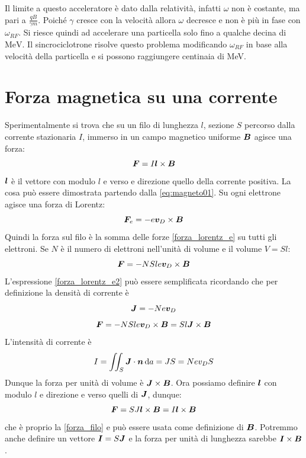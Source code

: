 \begin{Es}[Ciclotrone]
  Il limite a questo acceleratore è dato dalla relatività, infatti $\omega$ non è costante, ma pari a $\frac{qB}{\gamma m}$. Poiché $\gamma$ cresce con la velocità allora $\omega$ decresce e non è più in fase con $\omega_{RF}$. Si riesce quindi ad accelerare una particella solo fino a qualche decina di $\si{\MeV}$. Il sincrociclotrone risolve questo problema modificando $\omega_{RF}$ in base alla velocità della particella e si possono raggiungere centinaia di \si{\MeV}.
\end{Es}


\section{Forza magnetica su una corrente}
Sperimentalmente si trova che su un filo di lunghezza $l$, sezione $S$ percorso dalla corrente stazionaria $I$, immerso in un campo magnetico uniforme $\boldsymbol{B}$ agisce una forza:
\begin{equation}
  \boldsymbol{F}=I\boldsymbol{l}\times \boldsymbol{B}
  \label{forza_filo}
\end{equation}
$\boldsymbol{l}$ è il vettore con modulo $l$ e verso e direzione quello della corrente positiva. La cosa può essere dimostrata partendo dalla \eqref{eq:magneto01}. Su ogni elettrone agisce una forza di Lorentz:
\begin{equation}
  \boldsymbol{F}_e=-e\boldsymbol{v}_D\times\boldsymbol{B}
  \label{forza_lorentz_e}
\end{equation}
Quindi la forza sul filo è la somma delle forze \eqref{forza_lorentz_e} su tutti gli elettroni. Se $N$ è il numero di elettroni nell'unità di volume e il volume $V=Sl$:
\begin{equation}
  \boldsymbol{F}=-NSle\boldsymbol{v}_D\times\boldsymbol{B}
  \label{forza_lorentz_e2}
\end{equation}
L'espressione \eqref{forza_lorentz_e2} può essere semplificata ricordando che per definizione la densità di corrente è
\[
  \boldsymbol{J}=-Ne\boldsymbol{v}_D
\]
\begin{equation}
  \boldsymbol{F}=-NSle\boldsymbol{v}_D\times\boldsymbol{B}=Sl\boldsymbol{J}\times\boldsymbol{B}
\end{equation}
L'intensità di corrente è
\[I=\iint_S \boldsymbol{J}\cdot \boldsymbol{n}\,\mathrm{d} a=JS=Nev_DS\]
Dunque la forza per unità di volume è $\boldsymbol{J}\times\boldsymbol{B}$. Ora possiamo definire $\boldsymbol{l}$ con modulo $l$ e direzione e verso quelli di $\boldsymbol{J}$, dunque:
\begin{equation}
  \boldsymbol{F}=SJ\boldsymbol{l}\times\boldsymbol{B}=I\boldsymbol{l}\times \boldsymbol{B}
  \label{forza_lorentz_3}
\end{equation}
che è proprio la \eqref{forza_filo} e può essere usata come definizione di $\boldsymbol{B}$. Potremmo anche definire un vettore $\boldsymbol{I}=S\boldsymbol{J}$ e la forza per unità di lunghezza sarebbe $\boldsymbol{I}\times\boldsymbol{B}$.

